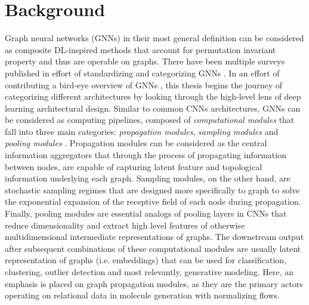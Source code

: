\section{Background}
Graph neural networks (GNNs) in their most general definition can be considered
as composite DL-inspired methods that account for permutation
invariant property and thus are operable on graphs. There have been multiple surveys
published in effort of standardizing and categorizing GNNs
\citep{zhangdeeplearninggraphs2020, zhouGraphNeuralNetworks2020,
chamiMachineLearningGraphs2022, gilmerNeuralMessagePassing2017}. In
an effort of contributing a bird-eye overview of GNNs , this thesis begins the
journey of categorizing different architectures by looking through the
high-level lens of deep learning architectural design. Similar to common CNNs
architectures, GNNs can be considered as computing pipelines, composed of
\textit{computational modules} that fall into three main categories:
\textit{propagation modules}, \textit{sampling modules} and \textit{pooling
modules} \citep{zhouGraphNeuralNetworks2020}. Propagation modules can be
considered as the central information aggregators that through the process of
propagating information between nodes, are capable of capturing latent feature
and topological information underlying each graph. Sampling modules, on the
other hand, are stochastic sampling regimes that are designed more specifically
to graph to solve the exponential expansion of the receptive field of each node
during propagation. Finally, pooling modules are essential analogs of pooling
layers in CNNs that reduce dimensionality and extract high level features of
otherwise multidimensional intermediate representations of graphs. The
downstream output after subsequent combinations of these computational modules
are usually latent representation of graphs (i.e. embeddings) that can be used
for classification, clustering, outlier detection and most relevantly,
generative modeling. Here, an emphasis is placed on graph propagation
modules, as they are the primary actors operating on relational data in
molecule generation with normalizing flows.

